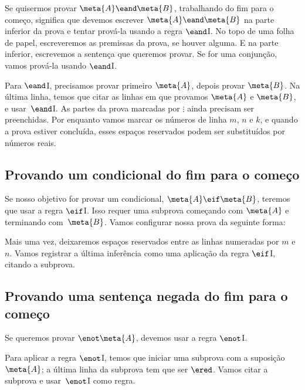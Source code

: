 Se quisermos provar  $\meta{A} \eand \meta{B}$,  trabalhando do fim para o começo, significa que devemos escrever $\meta{A} \eand \meta{B}$ na parte inferior da prova e tentar prová-la usando a regra $\eand$I. No topo de uma folha de papel, escreveremos as premissas  da prova, se houver alguma. E  na parte inferior, escrevemos a sentença que queremos provar. Se for uma conjunção, vamos prová-la usando $\eand$I.
  \begin{fitchproof}
	\ellipsesline 
\ellipsesline
    \ellipsesline 
  \end{fitchproof}
Para $\eand$I, precisamos provar primeiro $\meta{A}$, depois provar $\meta{B}$. Na última linha, temos que citar as linhas em que provamos $\meta{A}$ e  $\meta{B}$, e usar~$\eand$I. As partes da prova marcadas por $\vdots$ ainda precisam ser preenchidas.
Por enquanto vamos marcar os números de linha $m$, $n$ e $k$, e quando a prova estiver concluída, esses espaços reservados podem ser substituídos por números reais.
 

\subsection*{Provando um condicional do fim para o começo}

Se nosso objetivo for provar um condicional,  $\meta{A} \eif \meta{B}$, teremos que usar a regra $\eif$I. Isso requer uma subprova começando com $\meta{A}$ e terminando com~$\meta{B}$. Vamos configurar nossa prova da seguinte forma:
\begin{fitchproof}
\open
{}
\ellipsesline 
{}
\close
{}
\end{fitchproof} 
Mais uma vez, deixaremos espaços reservados entre as  linhas numeradas por $m$ e $n$. Vamos registrar a última inferência como uma aplicação da regra $\eif$I, citando a subprova.

\subsection*{Provando uma sentença negada do fim para o começo}

Se queremos provar $\enot \meta{A}$, devemos usar a regra $\enot$I.
\begin{fitchproof}
\open
{}
\ellipsesline 
{}
\close
{}
\end{fitchproof} 
Para aplicar a regra $\enot$I, temos que iniciar uma subprova com a suposição $\meta{A}$; a última linha da subprova tem que ser $\ered$.  Vamos citar a subprova e usar~$\enot$I como regra.  

